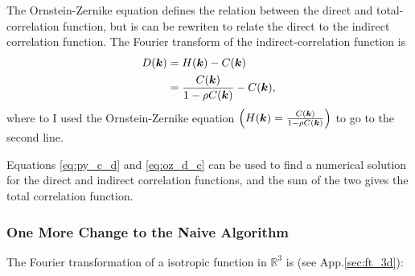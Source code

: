 The Ornstein-Zernike equation defines the relation between the direct and total-correlation function, but is can be rewriten to relate the direct to the indirect correlation function.
The Fourier transform of the indirect-correlation function is
\begin{align}
D(\boldsymbol{k}) &= H(\boldsymbol{k}) - C(\boldsymbol{k})\\
&= \frac{C(\boldsymbol{k})}{1 - \rho C(\boldsymbol{k})} - C(\boldsymbol{k}),
\label{eq:oz_d_c}
\end{align}
where to I used the Ornstein-Zernike equation $\left( H(\boldsymbol{k}) = \frac{C(\boldsymbol{k})}{1 - \rho C(\boldsymbol{k})}\right)$ to go to the second line.


Equations \eqref{eq:py_c_d} and \eqref{eq:oz_d_c} can be used to find a numerical solution for the direct and indirect correlation functions, and the sum of the two gives the total correlation function.

\subsubsection{One More Change to the Naive Algorithm}
The Fourier transformation of a isotropic function in $\mathbb{R}^3$ is (see App.\ref{sec:ft_3d}):

